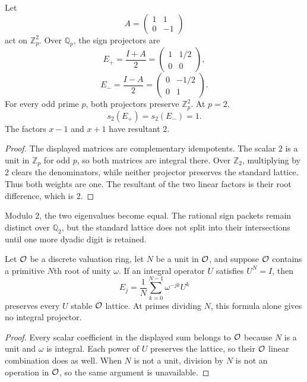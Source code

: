 \begin{proposition}\label{prop:sign_projectors}
Let
\[
A=
\begin{pmatrix}
1&1\\
0&-1
\end{pmatrix}
\]
act on $\mathbb Z_p^2$.  Over $\mathbb Q_p$, the sign projectors are
\[
E_+=\frac{I+A}{2}
=
\begin{pmatrix}
1&1/2\\
0&0
\end{pmatrix},
\]
\[
E_-=\frac{I-A}{2}
=
\begin{pmatrix}
0&-1/2\\
0&1
\end{pmatrix}.
\]
For every odd prime $p$, both projectors preserve $\mathbb Z_p^2$.  At $p=2$,
\[
s_2(E_+)=s_2(E_-)=1.
\]
The factors $x-1$ and $x+1$ have resultant $2$.
\end{proposition}

\begin{proof}
The displayed matrices are complementary idempotents.  The scalar $2$ is a unit in $\mathbb Z_p$ for odd $p$, so both matrices are integral there.  Over $\mathbb Z_2$, multiplying by $2$ clears the denominators, while neither projector preserves the standard lattice.  Thus both weights are one.  The resultant of the two linear factors is their root difference, which is $2$.
\end{proof}

Modulo $2$, the two eigenvalues become equal.  The rational sign packets remain distinct over $\mathbb Q_2$, but the standard lattice does not split into their intersections until one more dyadic digit is retained.

\begin{proposition}\label{prop:character_integrality}
Let ${\mathcal O}$ be a discrete valuation ring, let $N$ be a unit in ${\mathcal O}$, and suppose ${\mathcal O}$ contains a primitive $N$th root of unity $\omega$.  If an integral operator $U$ satisfies $U^N=I$, then
\[
E_j=\frac1N\sum_{k=0}^{N-1}\omega^{-jk}U^k
\]
preserves every $U$ stable ${\mathcal O}$ lattice.  At primes dividing $N$, this formula alone gives no integral projector.
\end{proposition}

\begin{proof}
Every scalar coefficient in the displayed sum belongs to ${\mathcal O}$ because $N$ is a unit and $\omega$ is integral.  Each power of $U$ preserves the lattice, so their ${\mathcal O}$ linear combination does as well.  When $N$ is not a unit, division by $N$ is not an operation in ${\mathcal O}$, so the same argument is unavailable.
\end{proof}

